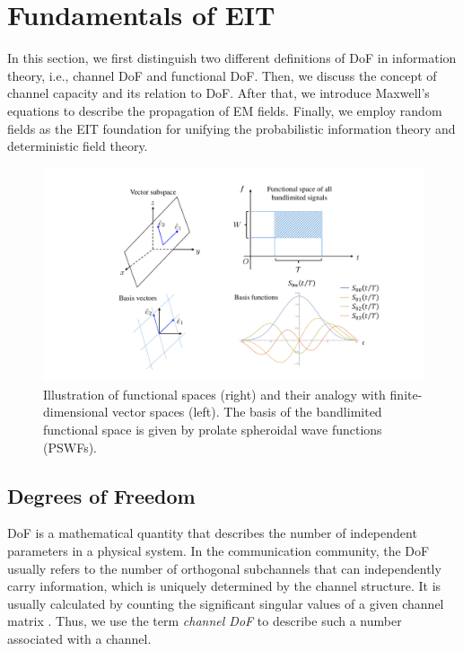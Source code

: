 \documentclass[journal,twocolumn]{IEEEtran}
\begin{document}
\vspace{-1em}
\section{Fundamentals of EIT}
In this section, we first distinguish two different definitions of DoF in information theory, i.e., channel DoF and functional DoF.  
Then, we discuss the concept of channel capacity and its relation to DoF. 
After that, we introduce Maxwell's equations to describe the propagation of EM fields. 
Finally, we employ random fields as the EIT foundation for unifying the probabilistic information theory and deterministic field theory. 

\begin{figure}
	\centering 
	\includegraphics[width=\linewidth]{figures/PSWF.pdf} 
	\caption{Illustration of functional spaces (right) and their analogy with finite-dimensional vector spaces (left). The basis of the bandlimited functional space is given by prolate spheroidal wave functions (PSWFs). }
	\label{fig:PSWF}
\end{figure}

\vspace{-1em}
\subsection{Degrees of Freedom}
\label{Sec_2_Subsec_1}
DoF is a mathematical quantity that describes the number of independent parameters in a physical system. 
In the communication community, the DoF usually refers to the number of orthogonal subchannels that can independently carry information, which is uniquely determined by the channel structure. It is usually calculated by counting the significant singular values of a given channel matrix \cite{goldsmith2003capacity}. 
Thus, we use the term {{\emph{channel DoF}}} to describe such a number associated with a channel.
\end{document}
